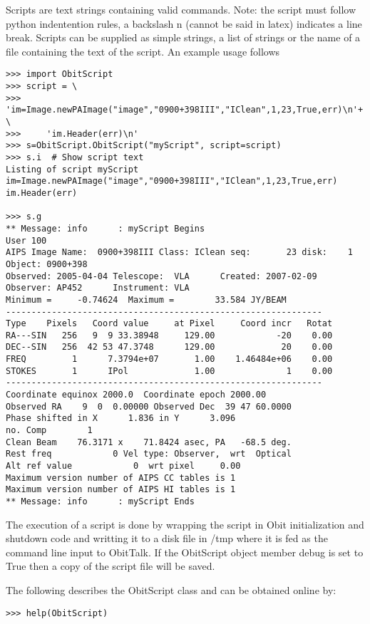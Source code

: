 \documentclass[11pt]{report}
\begin{document}
Scripts are text strings containing valid commands.
Note: the script must follow python indentention rules, a backslash n 
(cannot be said in latex) indicates a line break.
Scripts can be supplied as simple strings, a list of strings or the
name of a file containing the text of the script.
An example usage follows
\begin{verbatim}
>>> import ObitScript
>>> script = \
>>>     'im=Image.newPAImage("image","0900+398III","IClean",1,23,True,err)\n'+ \
>>>     'im.Header(err)\n'
>>> s=ObitScript.ObitScript("myScript", script=script)
>>> s.i  # Show script text
Listing of script myScript
im=Image.newPAImage("image","0900+398III","IClean",1,23,True,err)
im.Header(err)

>>> s.g
** Message: info      : myScript Begins
User 100
AIPS Image Name:  0900+398III Class: IClean seq:       23 disk:    1
Object: 0900+398
Observed: 2005-04-04 Telescope:  VLA      Created: 2007-02-09
Observer: AP452      Instrument: VLA      
Minimum =     -0.74624  Maximum =        33.584 JY/BEAM 
--------------------------------------------------------------
Type    Pixels   Coord value     at Pixel     Coord incr   Rotat
RA---SIN   256   9  9 33.38948     129.00            -20    0.00
DEC--SIN   256  42 53 47.3748      129.00             20    0.00
FREQ         1      7.3794e+07       1.00    1.46484e+06    0.00
STOKES       1      IPol             1.00              1    0.00
--------------------------------------------------------------
Coordinate equinox 2000.0  Coordinate epoch 2000.00
Observed RA    9  0  0.00000 Observed Dec  39 47 60.0000 
Phase shifted in X      1.836 in Y      3.096
no. Comp        1
Clean Beam    76.3171 x    71.8424 asec, PA   -68.5 deg.
Rest freq            0 Vel type: Observer,  wrt  Optical
Alt ref value            0  wrt pixel     0.00
Maximum version number of AIPS CC tables is 1 
Maximum version number of AIPS HI tables is 1 
** Message: info      : myScript Ends
\end{verbatim}

The execution of a script is done by wrapping the script in Obit
initialization and shutdown code and writting it to a disk file in /tmp
where it is fed as the command line input to ObitTalk.
If the ObitScript object member debug is set to True then a copy
of the script file will be saved.

The following describes the ObitScript class and can be obtained
online by:
\begin{verbatim}
>>> help(ObitScript)
\end{verbatim}
\end{document}

